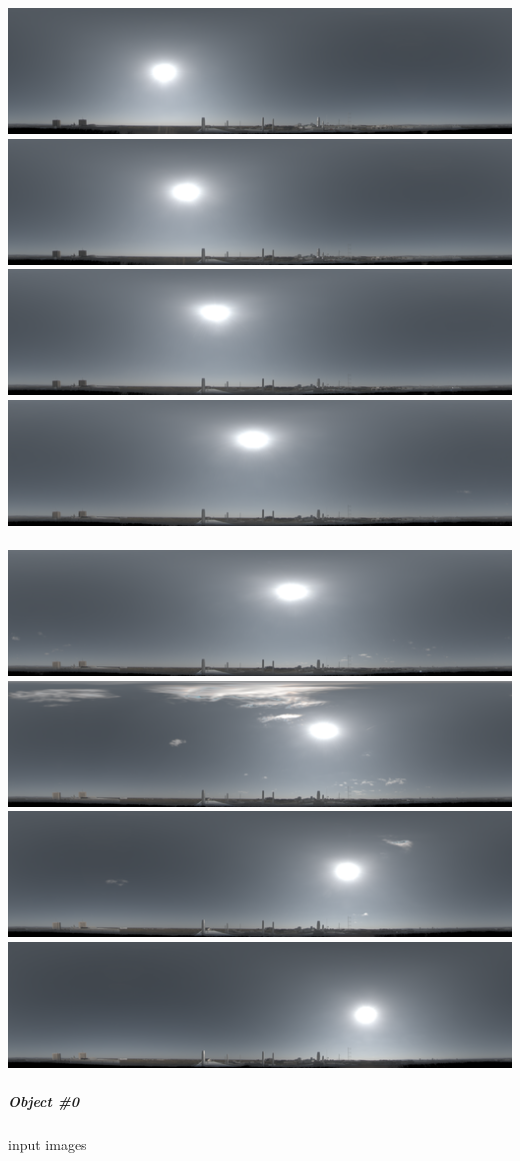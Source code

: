 \includegraphics[width=0.24\linewidth]{semisynthetic/20150514/094109.png}
\includegraphics[width=0.24\linewidth]{semisynthetic/20150514/103709.png}
\includegraphics[width=0.24\linewidth]{semisynthetic/20150514/113309.png}
\includegraphics[width=0.24\linewidth]{semisynthetic/20150514/122909.png}\\
~\\
\includegraphics[width=0.24\linewidth]{semisynthetic/20150514/132509.png}
\includegraphics[width=0.24\linewidth]{semisynthetic/20150514/142109.png}
\includegraphics[width=0.24\linewidth]{semisynthetic/20150514/151709.png}
\includegraphics[width=0.24\linewidth]{semisynthetic/20150514/161309.png}\\

\hypertarget{object-0}{%
\subparagraph{Object \#0}\label{object-0}}

input images

